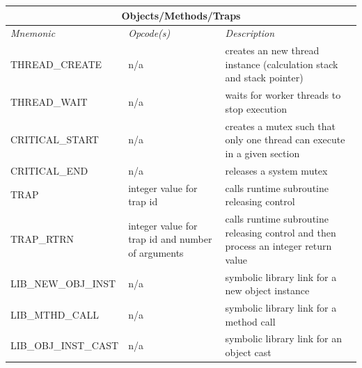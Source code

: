 \documentclass[12pt]{article}
\begin{document}
\begin{center}
\vspace{\baselineskip}
\begin{tabular}{| l | p{4 cm} | p{6 cm} |}
\hline
\multicolumn{3}{|c|}{\textbf{Objects/Methods/Traps}} \\
\hline
\emph{Mnemonic}  &  \emph{Opcode(s)}  &  \emph{Description} \\ \hline \hline
THREAD\_CREATE & n/a & creates an new thread instance (calculation stack and  stack pointer) \\ \hline
THREAD\_WAIT & n/a & waits for worker threads to stop execution \\ \hline
CRITICAL\_START & n/a & creates a mutex such that only one thread can execute in a given section \\ \hline
CRITICAL\_END & n/a & releases a system mutex \\ \hline
TRAP & integer value for trap id & calls runtime subroutine releasing control \\ \hline
TRAP\_RTRN & integer value for trap id and number of arguments & calls runtime subroutine releasing control and then process an integer return value \\ \hline
LIB\_NEW\_OBJ\_INST & n/a & symbolic library link for a new object instance  \\ \hline
LIB\_MTHD\_CALL & n/a & symbolic library link for a method call  \\ \hline
LIB\_OBJ\_INST\_CAST & n/a & symbolic library link for an object cast  \\ \hline
\end{tabular}

\end{center}
\end{document}
